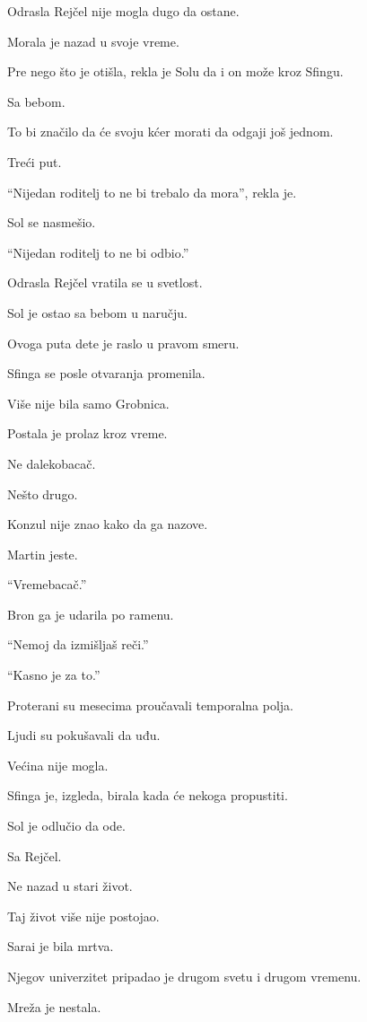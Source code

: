 \bigskip

Odrasla Rejčel nije mogla dugo da ostane.

Morala je nazad u svoje vreme.

Pre nego što je otišla, rekla je Solu da i on može kroz Sfingu.

Sa bebom.

To bi značilo da će svoju kćer morati da odgaji još jednom.

Treći put.

``Nijedan roditelj to ne bi trebalo da mora'', rekla je.

Sol se nasmešio.

``Nijedan roditelj to ne bi odbio.''

\bigskip

Odrasla Rejčel vratila se u svetlost.

Sol je ostao sa bebom u naručju.

Ovoga puta dete je raslo u pravom smeru.

\bigskip

Sfinga se posle otvaranja promenila.

Više nije bila samo Grobnica.

Postala je prolaz kroz vreme.

Ne dalekobacač.

Nešto drugo.

Konzul nije znao kako da ga nazove.

Martin jeste.

``Vremebacač.''

Bron ga je udarila po ramenu.

``Nemoj da izmišljaš reči.''

``Kasno je za to.''

\bigskip

Proterani su mesecima proučavali temporalna polja.

Ljudi su pokušavali da uđu.

Većina nije mogla.

Sfinga je, izgleda, birala kada će nekoga propustiti.

Sol je odlučio da ode.

Sa Rejčel.

Ne nazad u stari život.

Taj život više nije postojao.

Sarai je bila mrtva.

Njegov univerzitet pripadao je drugom svetu i drugom vremenu.

Mreža je nestala.

